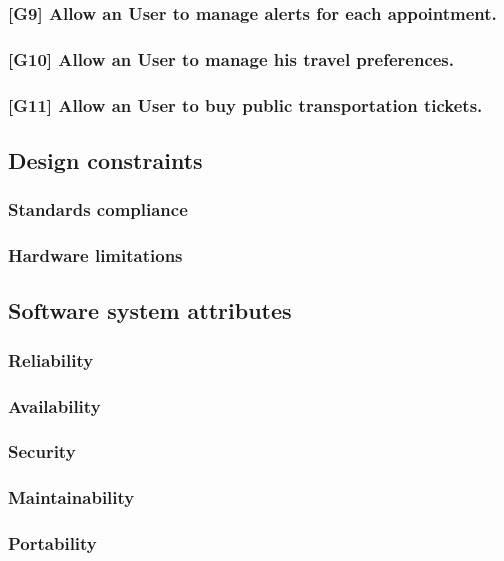 \subsubsection{[G9] Allow an User to manage alerts for each appointment.}
\subsubsection{[G10] Allow an User to manage his travel preferences.}
\subsubsection{[G11] Allow an User to buy public transportation tickets.}
\subsection{Design constraints}
\subsubsection{Standards compliance}
\subsubsection{Hardware limitations}
\subsection{Software system attributes}
\subsubsection{Reliability}
\subsubsection{Availability}
\subsubsection{Security}
\subsubsection{Maintainability}
\subsubsection{Portability}
